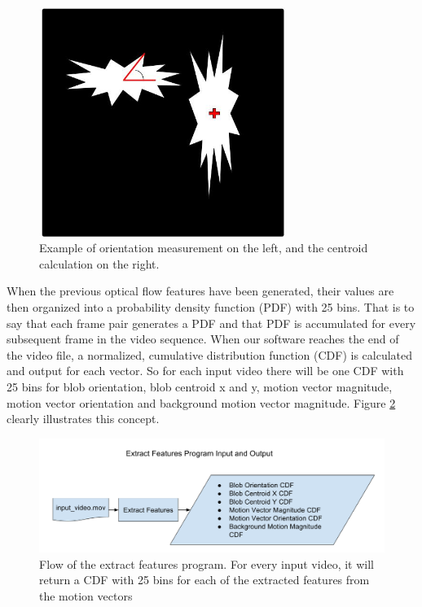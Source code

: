 \begin{figure}[h]
  \centering
  \includegraphics[width=8cm]{figures/cent_and_orient}
  \caption{Example of orientation measurement on the left, and the centroid
  calculation on the right.}
  \label{fig:orient_cent}
\end{figure}

When the previous optical flow features have been generated, their values are
then organized into a probability density function (PDF) with 25 bins. That is
to say that each frame pair generates a PDF and that PDF is accumulated for
every subsequent frame in the video sequence. When our software reaches the end
of the video file, a normalized, cumulative distribution function (CDF) is
calculated and output for each vector. So for each input video there will be one
CDF with 25 bins for blob orientation, blob centroid x and y, motion vector
magnitude, motion vector orientation and background motion vector magnitude.
Figure \ref{fig:extract_flow} clearly illustrates this concept.

\begin{figure}[h]
  \centering
  \includegraphics[width=\textwidth]{figures/extract_features_flow}
  \caption{Flow of the extract features program. For every input video, it will
  return a CDF with 25 bins for each of the extracted features from the motion
  vectors}
  \label{fig:extract_flow}
\end{figure}

